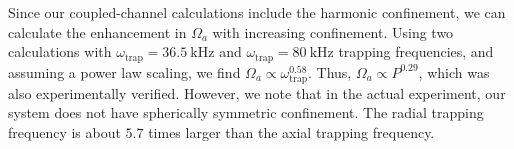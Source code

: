 \documentclass[aps,secnumarabic,amsmath,amssymb,superscriptaddress]{revtex4}
\newcommand{\todo}[1]{}
\begin{document}
Since our coupled-channel calculations include the harmonic confinement, we can calculate the enhancement in $\Omega_a$ with increasing confinement. Using two calculations with $ \omega_{\text{trap}} = 36.5~\mathrm{kHz}$ and $\omega_{\text{trap}} = 80~\mathrm{kHz}$ trapping frequencies, and assuming a power law scaling, we find $ \Omega_a \propto \omega_{\text{trap}}^{0.58} $. Thus, $\Omega_a \propto P^{0.29} $, which was also experimentally verified. However, we note that in the actual experiment, our system does not have spherically symmetric confinement. The radial trapping frequency is about $5.7$ times larger than the axial trapping frequency.
\todo{
  Power/intensity calibration
}


\end{document}
